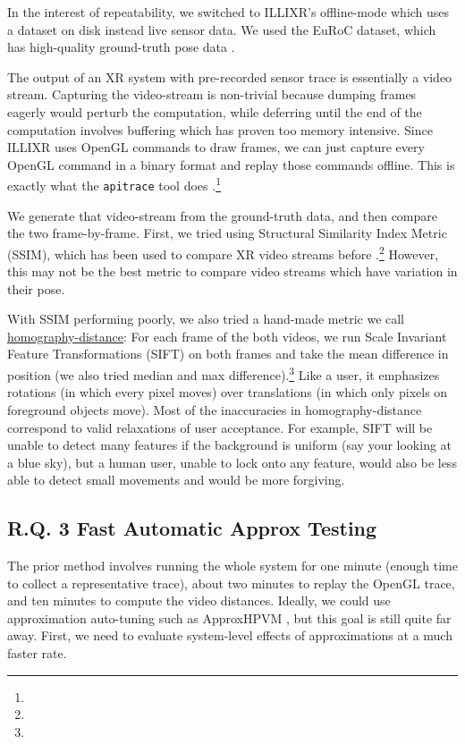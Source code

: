 In the interest of repeatability, we switched to ILLIXR's offline-mode which uses a dataset on disk instead live sensor data.
We used the EuRoC dataset, which has high-quality ground-truth pose data \cite{Burri25012016}.

The output of an XR system with pre-recorded sensor trace is essentially a video stream.
Capturing the video-stream is non-trivial because dumping frames eagerly would perturb the computation, while deferring until the end of the computation involves buffering which has proven too memory intensive.
Since ILLIXR uses OpenGL commands to draw frames, we can just capture every OpenGL command in a binary format and replay those commands offline.
This is exactly what the \verb+apitrace+ tool does \cite{apitrace}.\footnote{}

We generate that video-stream from the ground-truth data, and then compare the two frame-by-frame.
First, we tried using Structural Similarity Index Metric (SSIM), which has been used to compare XR video streams before \cite{SIFT}.\footnote{}
However, this may not be the best metric to compare video streams which have variation in their pose.

With SSIM performing poorly, we also tried a hand-made metric we call \ul{homography-distance}:
For each frame of the both videos, we run Scale Invariant Feature Transformations (SIFT) on both frames  and take the mean difference in position (we also tried median and max difference).\footnote{}
Like a user, it emphasizes rotations (in which every pixel moves) over translations (in which only pixels on foreground objects move).
Most of the inaccuracies in homography-distance correspond to valid relaxations of user acceptance.
For example, SIFT will be unable to detect many features if the background is uniform (say your looking at a blue sky),
    but a human user, unable to lock onto any feature, would also be less able to detect small movements and would be more forgiving.

\subsection{R.Q. 3 Fast Automatic Approx Testing}

The prior method involves running the whole system for one minute (enough time to collect a representative trace), about two minutes to replay the OpenGL trace, and ten minutes to compute the video distances.
Ideally, we could use approximation auto-tuning such as ApproxHPVM \cite{approxhpvm}, but this goal is still quite far away. First, we need to evaluate system-level effects of approximations at a much faster rate.

